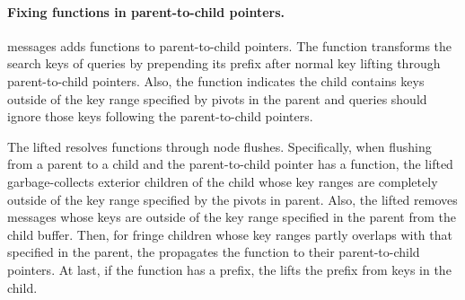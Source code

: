 \paragraph{Fixing \xf functions in parent-to-child pointers.}
\goto messages adds \xf functions to parent-to-child pointers.
The \xf function transforms the search keys of queries by prepending its prefix
after normal key lifting through parent-to-child pointers.
Also, the \xf function indicates the child contains keys outside of the key range
specified by pivots in the parent and queries should ignore those keys following
the parent-to-child pointers.

The lifted \bedag resolves \xf functions through node flushes.
Specifically, when flushing from a parent to a child and the parent-to-child
pointer has a \xf function,
the lifted \bedag garbage-collects exterior children of the child whose key
ranges are completely outside of the key range specified by the pivots in parent.
Also, the lifted \bedag removes messages whose keys are outside of the key
range specified in the parent from the child buffer.
Then, for fringe children whose key ranges partly overlaps with that specified
in the parent, the \bedag propagates the \xf function to their parent-to-child
pointers.
At last, if the \xf function has a prefix, the \bedag lifts the prefix from
keys in the child.

